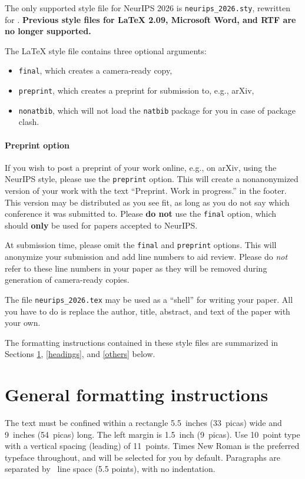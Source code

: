 \documentclass{article}
\begin{document}
The only supported style file for NeurIPS 2026 is \verb+neurips_2026.sty+, rewritten for \LaTeXe{}. \textbf{Previous style files for \LaTeX{} 2.09,  Microsoft Word, and RTF are no longer supported.}


The \LaTeX{} style file contains three optional arguments: 
\begin{itemize}
\item \verb+final+, which creates a camera-ready copy, 
\item \verb+preprint+, which creates a preprint for submission to, e.g., arXiv, \item \verb+nonatbib+, which will not load the \verb+natbib+ package for you in case of package clash.
\end{itemize}


\paragraph{Preprint option}
If you wish to post a preprint of your work online, e.g., on arXiv, using the NeurIPS style, please use the \verb+preprint+ option. This will create a nonanonymized version of your work with the text ``Preprint. Work in progress.'' in the footer. This version may be distributed as you see fit, as long as you do not say which conference it was submitted to. Please \textbf{do not} use the \verb+final+ option, which should \textbf{only} be used for papers accepted to NeurIPS.


At submission time, please omit the \verb+final+ and \verb+preprint+ options. This will anonymize your submission and add line numbers to aid review. Please do \emph{not} refer to these line numbers in your paper as they will be removed during generation of camera-ready copies.


The file \verb+neurips_2026.tex+ may be used as a ``shell'' for writing your paper. All you have to do is replace the author, title, abstract, and text of the paper with your own.


The formatting instructions contained in these style files are summarized in Sections \ref{gen_inst}, \ref{headings}, and \ref{others} below.


\section{General formatting instructions}
\label{gen_inst}


The text must be confined within a rectangle 5.5~inches (33~picas) wide and
9~inches (54~picas) long. The left margin is 1.5~inch (9~picas).  Use 10~point
type with a vertical spacing (leading) of 11~points.  Times New Roman is the
preferred typeface throughout, and will be selected for you by default.
Paragraphs are separated by ~line space (5.5 points), with no
indentation.
\end{document}

